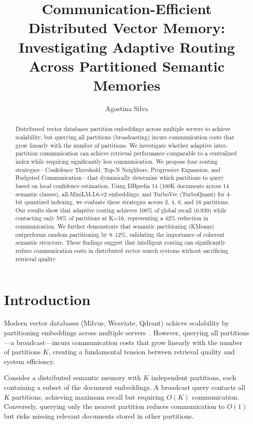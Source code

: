 \documentclass[10pt,twocolumn]{article}
\title{Communication-Efficient Distributed Vector Memory:\\ Investigating Adaptive Routing Across Partitioned Semantic Memories}
\author{
  Agostina Silva
}
\date{}
\begin{document}
\maketitle

\begin{abstract}
Distributed vector databases partition embeddings across multiple servers to achieve scalability, but querying all partitions (broadcasting) incurs communication costs that grow linearly with the number of partitions. We investigate whether adaptive inter-partition communication can achieve retrieval performance comparable to a centralized index while requiring significantly less communication. We propose four routing strategies---Confidence Threshold, Top-N Neighbors, Progressive Expansion, and Budgeted Communication---that dynamically determine which partitions to query based on local confidence estimation. Using DBpedia 14 (100K documents across 14 semantic classes), all-MiniLM-L6-v2 embeddings, and TurboVec (TurboQuant) for 4-bit quantized indexing, we evaluate these strategies across 2, 4, 8, and 16 partitions. Our results show that adaptive routing achieves 100\% of global recall (0.939) while contacting only 58\% of partitions at K=16, representing a 42\% reduction in communication. We further demonstrate that semantic partitioning (KMeans) outperforms random partitioning by 8--12\%, validating the importance of coherent semantic structure. These findings suggest that intelligent routing can significantly reduce communication costs in distributed vector search systems without sacrificing retrieval quality.
\end{abstract}

\section{Introduction}

Modern vector databases (Milvus, Weaviate, Qdrant) achieve scalability by partitioning embeddings across multiple servers~\cite{pyramid,fedvs}. However, querying all partitions---a broadcast---incurs communication costs that grow linearly with the number of partitions $K$, creating a fundamental tension between retrieval quality and system efficiency.

Consider a distributed semantic memory with $K$ independent partitions, each containing a subset of the document embeddings. A broadcast query contacts all $K$ partitions, achieving maximum recall but requiring $O(K)$ communication. Conversely, querying only the nearest partition reduces communication to $O(1)$ but risks missing relevant documents stored in other partitions.
\end{document}

